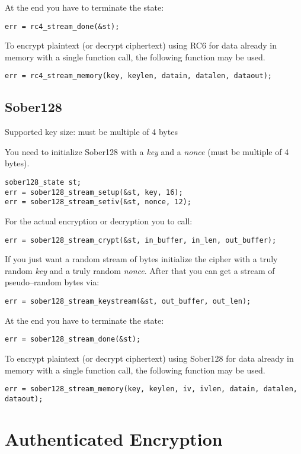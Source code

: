 \documentclass[synpaper]{book}
\newcommand{\mysection}[1]    %
	{                   %
	\section{#1}
   \markboth{\textsf{www.libtom.net}}{\thesection ~ {#1}}
	}
\begin{document}
At the end you have to terminate the state:
\begin{verbatim}
err = rc4_stream_done(&st);
\end{verbatim}

To encrypt plaintext (or decrypt ciphertext) using RC6 for data already in
memory with a single function call, the following function may be used.
\begin{verbatim}
err = rc4_stream_memory(key, keylen, datain, datalen, dataout);
\end{verbatim}

\mysection{Sober128}

Supported key size: must be multiple of 4 bytes

You need to initialize Sober128 with a \textit{key} and a \textit{nonce} (must be multiple of 4 bytes).
\begin{verbatim}
sober128_state st;
err = sober128_stream_setup(&st, key, 16);
err = sober128_stream_setiv(&st, nonce, 12);
\end{verbatim}

For the actual encryption or decryption you to call:
\begin{verbatim}
err = sober128_stream_crypt(&st, in_buffer, in_len, out_buffer);
\end{verbatim}

If you just want a random stream of bytes initialize the cipher with a truly random \textit{key}
and a truly random \textit{nonce}. After that you can get a stream of pseudo--random bytes via:
\begin{verbatim}
err = sober128_stream_keystream(&st, out_buffer, out_len);
\end{verbatim}

At the end you have to terminate the state:
\begin{verbatim}
err = sober128_stream_done(&st);
\end{verbatim}

To encrypt plaintext (or decrypt ciphertext) using Sober128 for data already in
memory with a single function call, the following function may be used.
\begin{verbatim}
err = sober128_stream_memory(key, keylen, iv, ivlen, datain, datalen, dataout);
\end{verbatim}

\chapter{Authenticated Encryption}
\end{document}
